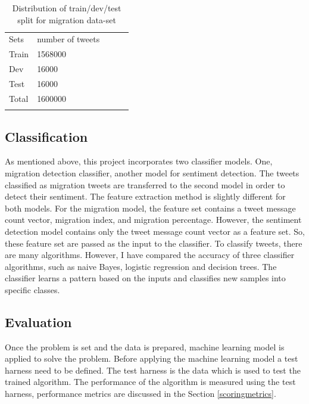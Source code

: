 \begin{table}[]
\centering
\begin{tabular}{lllll}
\cline{1-2}
\multicolumn{1}{|l|}{Sets}   & \multicolumn{1}{l|}{number of tweets} &  &  &  \\ \cline{1-2}
\multicolumn{1}{|l|}{Train} & \multicolumn{1}{l|}{1568000}  &  &  &  \\ \cline{1-2}
\multicolumn{1}{|l|}{Dev} & \multicolumn{1}{l|}{16000 }  &  &  &  \\ \cline{1-2}
\multicolumn{1}{|l|}{Test} & \multicolumn{1}{l|}{16000 }  &  &  &  \\ \cline{1-2}
\multicolumn{1}{|l|}{Total}   & \multicolumn{1}{l|}{1600000}  &  &  &  \\ \cline{1-2}
                            &                           &  &  & 
\label{tab:Distribution of sentiment class}
\end{tabular}
\caption{Distribution of train/dev/test split for migration data-set}
\label{tab:Distsentimentdatset}
\end{table}


\subsection{Classification}
As mentioned above, this project incorporates two classifier models. One, migration detection classifier, another model for sentiment detection. The tweets classified as migration tweets are transferred to the second model in order to detect their sentiment. The feature extraction method is slightly different for both models. For the migration model, the feature set contains a tweet message count vector, migration index, and migration percentage. However, the sentiment detection model contains only the tweet message count vector as a feature set. So, these feature set are passed as the input to the classifier. To classify tweets, there are many algorithms. However, I have compared the accuracy of three classifier algorithms, such as naive Bayes, logistic regression and decision trees. The classifier learns a pattern based on the inputs and classifies new samples into specific classes.



\subsection{Evaluation} \label{eval}
Once the problem is set and the data is prepared, machine learning model is applied to solve the problem. Before applying the machine learning model a test harness need to be defined. The test harness is the data which is used to test the trained algorithm. The performance of the algorithm is measured using the test harness, performance metrics are discussed in the Section \ref{scoringmetrics}.

